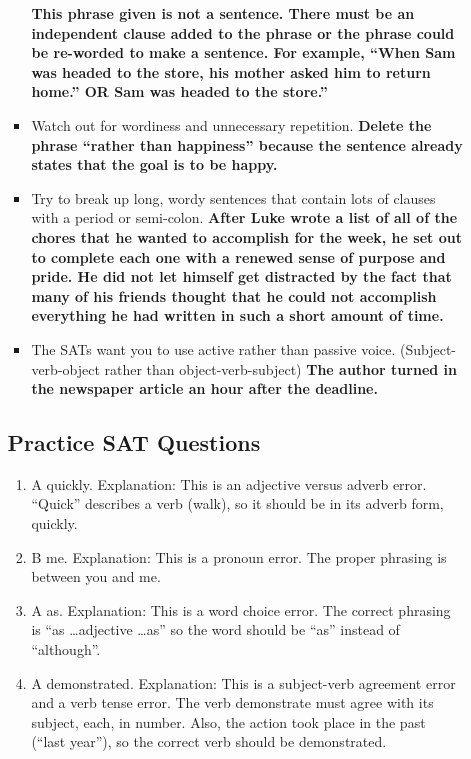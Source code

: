 \begin{enumerate}
\begin{itemize}
\begin{itemize}
\textbf{This phrase given is not a sentence. There must be an independent clause added to the phrase or the phrase could be re-worded to make a sentence. For example, ``When Sam was headed to the store, his mother asked him to return home.'' OR Sam was headed to the store.''}

\item Watch out for wordiness and unnecessary repetition. \textbf{Delete the phrase ``rather than happiness'' because the sentence already states that the goal is to be happy.}

\item Try to break up long, wordy sentences that contain lots of clauses with a period or semi-colon. \textbf{After Luke wrote a list of all of the chores that he wanted to accomplish for the week, he set out to complete each one with a renewed sense of purpose and pride. He did not let himself get distracted by the fact that many of his friends thought that he could not accomplish everything he had written in such a short amount of time.}

\item The SATs want you to use active rather than passive voice. (Subject-verb-object rather than object-verb-subject) \textbf{The  author turned in the newspaper article an hour after the deadline.}

\end{itemize}

\subsection{Practice SAT Questions}

\begin{enumerate}
\item A quickly. Explanation: This is an adjective versus adverb error. ``Quick'' describes a verb (walk), so it should be in its adverb form, quickly. 

\item B me. Explanation: This is a pronoun error. The proper phrasing is between you and me. 

\item A as. Explanation: This is a word choice error. The correct phrasing is ``as \ldots adjective \ldots as'' so the word should be ``as'' instead of ``although''. 

\item A demonstrated. Explanation: This is a subject-verb agreement error and a verb tense error. The verb demonstrate must agree with its subject, each, in number. Also, the action took place in the past (``last year''), so the correct verb should be demonstrated. 


\end{enumerate}
\end{itemize}
\end{enumerate}
